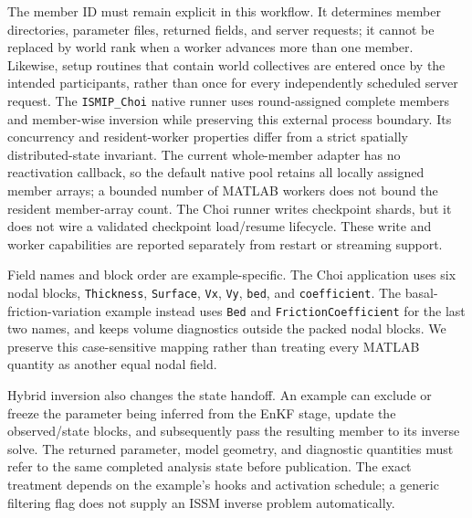 \documentclass[11pt,a4paper]{article}
\newcommand{\code}[1]{\nolinkurl{#1}}
\begin{document}
The member ID must remain explicit in this workflow. It determines member directories, parameter files, returned fields, and server requests; it cannot be replaced by world rank when a worker advances more than one member. Likewise, setup routines that contain world collectives are entered once by the intended participants, rather than once for every independently scheduled server request. The \code{ISMIP_Choi} native runner uses round-assigned complete members and member-wise inversion while preserving this external process boundary. Its concurrency and resident-worker properties differ from a strict spatially distributed-state invariant. The current whole-member adapter has no reactivation callback, so the default native pool retains all locally assigned member arrays; a bounded number of MATLAB workers does not bound the resident member-array count. The Choi runner writes checkpoint shards, but it does not wire a validated checkpoint load/resume lifecycle. These write and worker capabilities are reported separately from restart or streaming support.

Field names and block order are example-specific. The Choi application uses six nodal blocks, \code{Thickness}, \code{Surface}, \code{Vx}, \code{Vy}, \code{bed}, and \code{coefficient}. The basal-friction-variation example instead uses \code{Bed} and \code{FrictionCoefficient} for the last two names, and keeps volume diagnostics outside the packed nodal blocks. We preserve this case-sensitive mapping rather than treating every MATLAB quantity as another equal nodal field.

Hybrid inversion also changes the state handoff. An example can exclude or freeze the parameter being inferred from the EnKF stage, update the observed/state blocks, and subsequently pass the resulting member to its inverse solve. The returned parameter, model geometry, and diagnostic quantities must refer to the same completed analysis state before publication. The exact treatment depends on the example's hooks and activation schedule; a generic filtering flag does not supply an ISSM inverse problem automatically.
\end{document}
